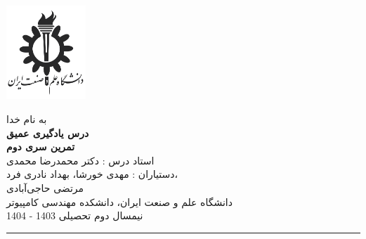 \begin{minipage}{0.1\textwidth}
\includegraphics[width=3cm]{etc/IUST}
\end{minipage}%
\hfill%
\begin{minipage}{0.6\textwidth}\centering
\fontsize{13pt}{13pt}\selectfont
به‌ نام خدا \\
\textbf{درس یادگیری عمیق} \\
\textbf{تمرین سری دوم}\\
استاد درس : دکتر محمدرضا محمدی \\
دستیاران :  مهدی خورشا، بهداد نادری فرد،\\مرتضی حاجی‌آبادی\\
\vspace{0.25cm}
\begingroup
\fontsize{11pt}{11pt}\selectfont
دانشگاه علم و صنعت ایران، دانشکده مهندسی کامپیوتر \\
نیمسال دوم تحصیلی 1403 - 1404 \\
\endgroup
\end{minipage}%
\hfill%
\begin{minipage}{0.1\textwidth}
\end{minipage}

\vspace{0.5cm}

\noindent\rule{\textwidth}{1pt}